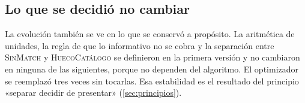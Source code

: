 \subsection{Lo que se decidió no cambiar}

La evolución también se ve en lo que se conservó a propósito. La aritmética
de unidades, la regla de que lo informativo no se cobra y la separación entre
\textsc{SinMatch} y \textsc{HuecoCatálogo} se definieron en la primera
versión y no cambiaron en ninguna de las siguientes, porque no dependen del
algoritmo. El optimizador se reemplazó tres veces sin tocarlas. Esa
estabilidad es el resultado del principio «separar decidir de presentar»
(\cref{sec:principios}).
